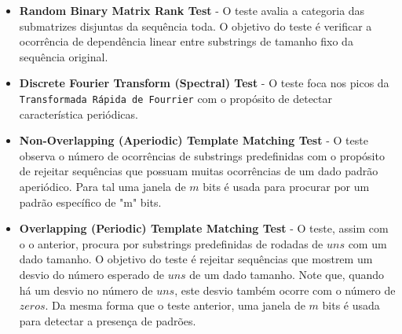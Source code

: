 \begin{itemize}
   \item \textbf{Random Binary Matrix Rank Test} - O teste avalia a categoria das submatrizes disjuntas da sequência toda. O objetivo do teste é verificar a ocorrência de dependência linear entre substrings de tamanho fixo da sequência original.
   \item \textbf{Discrete Fourier Transform (Spectral) Test} - O teste foca nos picos da \texttt{Transformada Rápida de Fourrier} com o propósito de detectar característica periódicas.
   \item \textbf{Non-Overlapping (Aperiodic) Template Matching Test} - O teste observa o número de ocorrências de substrings predefinidas com o propósito de rejeitar sequências que possuam muitas ocorrências de um dado padrão aperiódico. Para tal uma janela de $m$ bits é usada para procurar por um padrão específico de "m" bits.
   \item \textbf{Overlapping (Periodic) Template Matching Test} - O teste, assim com o o anterior, procura por substrings predefinidas de rodadas de $uns$ com um dado tamanho. O objetivo do teste é rejeitar sequências que mostrem um desvio do número esperado de $uns$ de um dado tamanho. Note que, quando há um desvio no número de $uns$, este desvio também ocorre com o número de $zeros$. Da mesma forma que o teste anterior, uma janela de $m$ bits é usada para detectar a presença de padrões.

\end{itemize}
